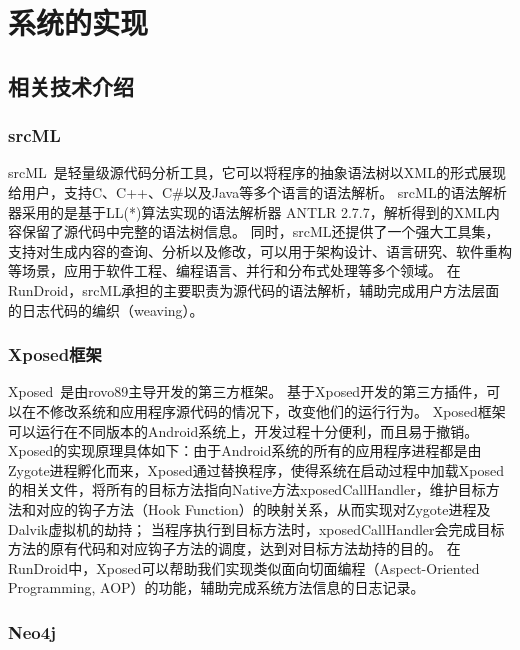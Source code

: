 \chapter{系统的实现 }
\label{chp:implement}


\section{相关技术介绍}



\subsection{srcML}

srcML~\cite{collard2013srcml}是轻量级源代码分析工具，它可以将程序的抽象语法树以XML的形式展现给用户，支持C、C++、C\#以及Java等多个语言的语法解析。
srcML的语法解析器采用的是基于LL(*)算法实现的语法解析器 ANTLR 2.7.7，解析得到的XML内容保留了源代码中完整的语法树信息。
同时，srcML还提供了一个强大工具集，支持对生成内容的查询、分析以及修改，可以用于架构设计、语言研究、软件重构等场景，应用于软件工程、编程语言、并行和分布式处理等多个领域。
在RunDroid，srcML承担的主要职责为源代码的语法解析，辅助完成用户方法层面的日志代码的编织（weaving）。

\subsection{Xposed框架}


Xposed~\cite{Xposed}是由rovo89主导开发的第三方框架。
基于Xposed开发的第三方插件，可以在不修改系统和应用程序源代码的情况下，改变他们的运行行为。
Xposed框架可以运行在不同版本的Android系统上，开发过程十分便利，而且易于撤销。
Xposed的实现原理具体如下：由于Android系统的所有的应用程序进程都是由Zygote进程孵化而来，Xposed通过替换程序，使得系统在启动过程中加载Xposed的相关文件，将所有的目标方法指向Native方法xposedCallHandler，维护目标方法和对应的钩子方法（Hook Function）的映射关系，从而实现对Zygote进程及Dalvik虚拟机的劫持；
当程序执行到目标方法时，xposedCallHandler会完成目标方法的原有代码和对应钩子方法的调度，达到对目标方法劫持的目的。
在RunDroid中，Xposed可以帮助我们实现类似面向切面编程（Aspect-Oriented Programming, AOP）的功能，辅助完成系统方法信息的日志记录。


\subsection{Neo4j}

